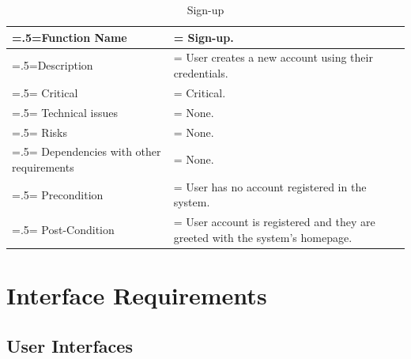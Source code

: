 \begin{center}
    \begin{table}[H]
        \caption{Sign-up}
        \begin{tabularx}{\textwidth} {
                | >{\raggedright\arraybackslash\hsize=.5\hsize\linewidth=\hsize}X
                | >{\raggedright\arraybackslash\hsize=1.5\hsize\linewidth=\hsize}X |}
            \hline
            Function Name                        & Sign-up.                                                                    \\ \hline
            Description                          & User creates a new account using their credentials.                         \\ \hline
            Critical                             & Critical.                                                                   \\ \hline
            Technical issues                     & None.                                                                       \\ \hline
            Risks                                & None.                                                                       \\ \hline
            Dependencies with other requirements & None.                                                                       \\ \hline
            Precondition                         & User has no account registered in the system.                               \\ \hline
            Post-Condition                       & User account is registered and they are greeted with the system's homepage. \\ \hline
        \end{tabularx}
    \end{table}
\end{center}

\section{Interface Requirements}
\subsection{User Interfaces}
